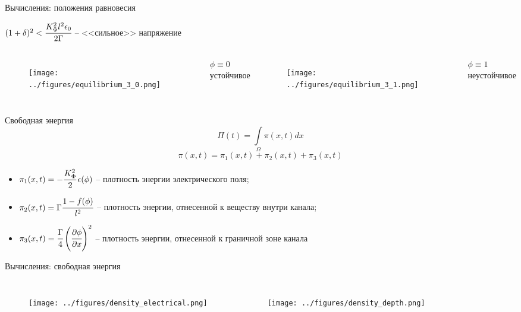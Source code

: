 \documentclass[aspectratio=169]{beamer}
\begin{document}
\begin{frame}{Вычисления: положения равновесия}
\vspace{-0.4cm}
\begin{center}
	$(1 + \delta)^2 < \cfrac{K_\Phi^2 l^2 \epsilon_0}{2 \Gamma}$ -- <<сильное>> напряжение
\end{center}
\vspace{-0.4cm}
\begin{columns}
\begin{figure}
	\texttt{[image: ../figures/equilibrium\_3\_0.png]}
\end{figure}
\vspace{-0.6cm}
\begin{center}
	$\phi \equiv 0$ \\
	устойчивое
\end{center}
\begin{figure}
	\texttt{[image: ../figures/equilibrium\_3\_1.png]}
\end{figure}
\vspace{-0.6cm}
\begin{center}
	$\phi \equiv 1$ \\
	неустойчивое
\end{center}
\end{columns}
\end{frame}


\begin{frame}{Свободная энергия}
\vspace{-0.7cm}
$$\Pi(t) = \int\limits_\Omega \pi(x, t) dx$$
$$\pi(x, t) = \pi_1(x, t) + \pi_2(x, t) + \pi_3(x, t)$$
\vspace{-0.3cm}
\begin{itemize}
	\item $\pi_1(x, t) = -\cfrac{K_\Phi^2}{2} \, \epsilon(\phi)$ -- плотность энергии
	электрического поля;
	\item $\pi_2(x, t) = \Gamma \cfrac{1 - f(\phi)}{l^2}$ -- плотность энергии, отнесенной
	к веществу внутри канала;
	\item $\pi_3(x, t) = \cfrac{\Gamma}{4} \left( \cfrac{\partial \phi}{\partial x} \right)^2$ --
	плотность энергии, отнесенной к граничной зоне канала
\end{itemize}
\end{frame}


\begin{frame}{Вычисления: свободная энергия}
\vspace{-0.8cm}
\begin{columns}
\begin{figure}
	\texttt{[image: ../figures/density\_electrical.png]}
\end{figure}
\begin{figure}
	\texttt{[image: ../figures/density\_depth.png]}
\end{figure}
\end{columns}
\end{frame}
\end{document}
